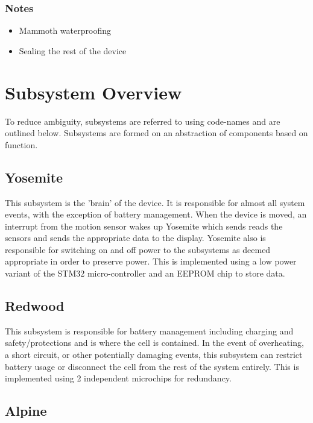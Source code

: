 \documentclass{article}
\begin{document}
\subsubsection{Notes}
\begin{itemize}
    \item Mammoth waterproofing
    \item Sealing the rest of the device
\end{itemize}


\pagebreak










\section{Subsystem Overview}

To reduce ambiguity, subsystems are referred to using code-names and are outlined below. Subsystems are formed on an abstraction of components based on function. 

\subsection*{Yosemite}

This subsystem is the 'brain' of the device. It is responsible for almost all system events, with the exception of battery management. When the device is moved, an interrupt from the motion sensor wakes up Yosemite which sends reads the sensors and sends the appropriate data to the display. Yosemite also is responsible for switching on and off power to the subsystems as deemed appropriate in order to preserve power. This is implemented using a low power variant of the STM32 micro-controller and an EEPROM chip to store data.


\subsection*{Redwood}

This subsystem is responsible for battery management including charging and safety/protections and is where the cell is contained. In the event of overheating, a short circuit, or other potentially damaging events, this subsystem can restrict battery usage or disconnect the cell from the rest of the system entirely. This is implemented using 2 independent microchips for redundancy.


\subsection*{Alpine}
\end{document}
